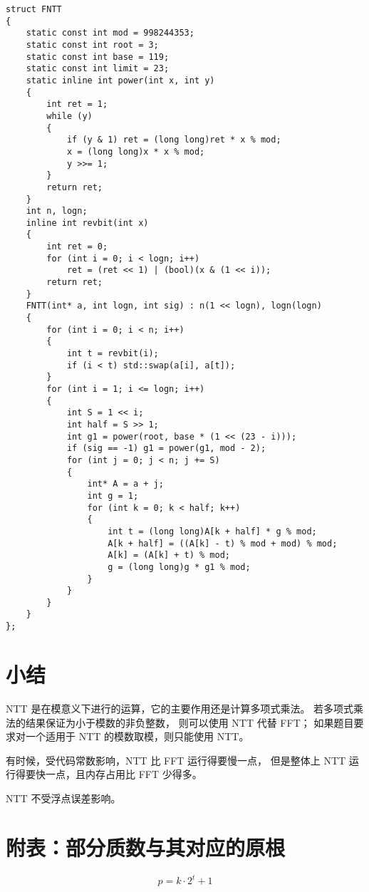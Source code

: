 \documentclass[12pt, UTF8]{article}
\begin{document}
    \lstset{language=C++}
    \begin{lstlisting}
struct FNTT
{
    static const int mod = 998244353;
    static const int root = 3;
    static const int base = 119;
    static const int limit = 23;
    static inline int power(int x, int y)
    {
        int ret = 1;
        while (y)
        {
            if (y & 1) ret = (long long)ret * x % mod;
            x = (long long)x * x % mod;
            y >>= 1;
        }
        return ret;
    }
    int n, logn;
    inline int revbit(int x)
    {
        int ret = 0;
        for (int i = 0; i < logn; i++)
            ret = (ret << 1) | (bool)(x & (1 << i));
        return ret;
    }
    FNTT(int* a, int logn, int sig) : n(1 << logn), logn(logn)
    {
        for (int i = 0; i < n; i++)
        {
            int t = revbit(i);
            if (i < t) std::swap(a[i], a[t]);
        }
        for (int i = 1; i <= logn; i++)
        {
            int S = 1 << i;
            int half = S >> 1;
            int g1 = power(root, base * (1 << (23 - i)));
            if (sig == -1) g1 = power(g1, mod - 2);
            for (int j = 0; j < n; j += S)
            {
                int* A = a + j;
                int g = 1;
                for (int k = 0; k < half; k++)
                {
                    int t = (long long)A[k + half] * g % mod;
                    A[k + half] = ((A[k] - t) % mod + mod) % mod;
                    A[k] = (A[k] + t) % mod;
                    g = (long long)g * g1 % mod;
                }
            }
        }
    }
};
    \end{lstlisting}

    \section{小结}
    NTT 是在模意义下进行的运算，它的主要作用还是计算多项式乘法。
    若多项式乘法的结果保证为小于模数的非负整数，
    则可以使用 NTT 代替 FFT；
    如果题目要求对一个适用于 NTT 的模数取模，则只能使用 NTT。

    有时候，受代码常数影响，NTT 比 FFT 运行得要慢一点，
    但是整体上 NTT 运行得要快一点，且内存占用比 FFT 少得多。
    
    NTT 不受浮点误差影响。

    \section{附表：部分质数与其对应的原根}
    \begin{equation*}
        p = k · 2^t + 1
    \end{equation*}
\end{document}
